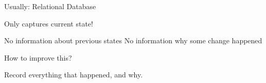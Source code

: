 \begin{frame}[fragile]{}

Usually: Relational Database
                  
                  Only captures current state!
                  
                  No information about previous states
                  No information why some change happened
                  
\end{frame}

\begin{frame}[fragile]{}

How to improve this?
                  
                  Record everything that happened, and why.
                  
\end{frame}

